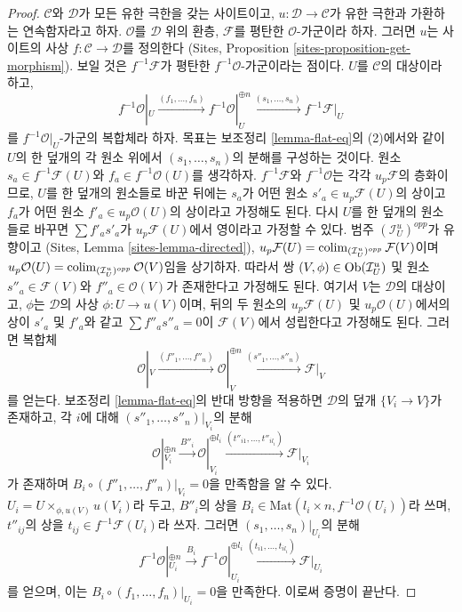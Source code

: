 \begin{proof}
\medskip\noindent
$\mathcal{C}$와 $\mathcal{D}$가 모든 유한 극한을 갖는 사이트이고,
$u : \mathcal{D} \to \mathcal{C}$가 유한 극한과 가환하는 연속함자라고 하자.
$\mathcal{O}$를 $\mathcal{D}$ 위의 환층,
$\mathcal{F}$를 평탄한 $\mathcal{O}$-가군이라 하자.
그러면 $u$는 사이트의 사상 $f : \mathcal{C} \to \mathcal{D}$를 정의한다
(Sites, Proposition \ref{sites-proposition-get-morphism}).
보일 것은 $f^{-1}\mathcal{F}$가 평탄한 $f^{-1}\mathcal{O}$-가군이라는 점이다.
$U$를 $\mathcal{C}$의 대상이라 하고,
$$
f^{-1}\mathcal{O}|_U \xrightarrow{(f_1, \ldots, f_n)}
f^{-1}\mathcal{O}|_U^{\oplus n} \xrightarrow{(s_1, \ldots, s_n)}
f^{-1}\mathcal{F}|_U
$$
를 $f^{-1}\mathcal{O}|_U$-가군의 복합체라 하자.
목표는 보조정리 \ref{lemma-flat-eq}의 (2)에서와 같이
$U$의 한 덮개의 각 원소 위에서 $(s_1, \ldots, s_n)$의 분해를
구성하는 것이다. 원소 $s_a \in f^{-1}\mathcal{F}(U)$와
$f_a \in f^{-1}\mathcal{O}(U)$를 생각하자.
$f^{-1}\mathcal{F}$와 $f^{-1}\mathcal{O}$는 각각 $u_p\mathcal{F}$의
층화이므로, $U$를 한 덮개의 원소들로 바꾼 뒤에는
$s_a$가 어떤 원소 $s'_a \in u_p\mathcal{F}(U)$의 상이고
$f_a$가 어떤 원소 $f'_a \in u_p\mathcal{O}(U)$의 상이라고 가정해도 된다.
다시 $U$를 한 덮개의 원소들로 바꾸면
$\sum f'_as'_a$가 $u_p\mathcal{F}(U)$에서 영이라고 가정할 수 있다.
범주 $(\mathcal{I}_U^u)^{opp}$가 유향이고
(Sites, Lemma \ref{sites-lemma-directed}),
$u_p\mathcal{F}(U) = \mathop{\mathrm{colim}}\nolimits_{(\mathcal{I}_U^u)^{opp}} \mathcal{F}(V)$이며
$u_p\mathcal{O}(U) = \mathop{\mathrm{colim}}\nolimits_{(\mathcal{I}_U^u)^{opp}} \mathcal{O}(V)$임을
상기하자. 따라서 쌍 $(V, \phi) \in \mathop{\mathrm{Ob}}\nolimits(\mathcal{I}_U^u)$ 및 원소
$s''_a \in \mathcal{F}(V)$와 $f''_a \in \mathcal{O}(V)$가 존재한다고
가정해도 된다. 여기서 $V$는 $\mathcal{D}$의 대상이고, $\phi$는
$\mathcal{D}$의 사상 $\phi : U \to u(V)$이며,
뒤의 두 원소의 $u_p\mathcal{F}(U)$ 및 $u_p\mathcal{O}(U)$에서의 상이
$s'_a$ 및 $f'_a$와 같고
$\sum f''_a s''_a = 0$이 $\mathcal{F}(V)$에서 성립한다고 가정해도 된다.
그러면 복합체
$$
\mathcal{O}|_V \xrightarrow{(f''_1, \ldots, f''_n)}
\mathcal{O}|_V^{\oplus n} \xrightarrow{(s''_1, \ldots, s''_n)}
\mathcal{F}|_V
$$
를 얻는다. 보조정리 \ref{lemma-flat-eq}의 반대 방향을 적용하면
$\mathcal{D}$의 덮개 $\{V_i \to V\}$가 존재하고, 각 $i$에 대해
$(s''_1, \ldots, s''_n)|_{V_i}$의 분해
$$
\mathcal{O}|_{V_i}^{\oplus n}
\xrightarrow{B''_i}
\mathcal{O}|_{V_i}^{\oplus l_i} \xrightarrow{(t''_{i1}, \ldots, t''_{il_i})}
\mathcal{F}|_{V_i}
$$
가 존재하며 $B_i \circ (f''_1, \ldots, f''_n)|_{V_i} = 0$을 만족함을 알 수 있다.
$U_i = U \times_{\phi, u(V)} u(V_i)$라 두고,
$B''_i$의 상을 $B_i \in \text{Mat}(l_i \times n, f^{-1}\mathcal{O}(U_i))$라
쓰며, $t''_{ij}$의 상을
$t_{ij} \in f^{-1}\mathcal{F}(U_i)$라 쓰자. 그러면
$(s_1, \ldots, s_n)|_{U_i}$의 분해
$$
f^{-1}\mathcal{O}|_{U_i}^{\oplus n}
\xrightarrow{B_i}
f^{-1}\mathcal{O}|_{U_i}^{\oplus l_i}
\xrightarrow{(t_{i1}, \ldots, t_{il_i})}
\mathcal{F}|_{U_i}
$$
를 얻으며, 이는 $B_i \circ (f_1, \ldots, f_n)|_{U_i} = 0$을 만족한다.
이로써 증명이 끝난다.
\end{proof}

